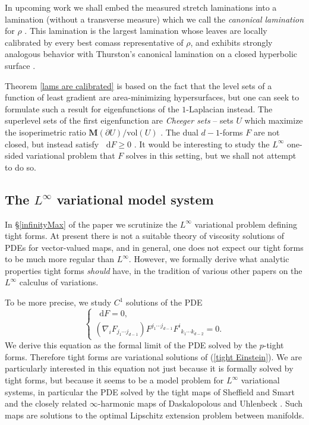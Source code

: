\documentclass[reqno,11pt]{amsart}
\newcommand*\dif{\mathop{}\!\mathrm{d}}
\newcommand{\vol}{\mathrm{vol}}
\newcommand{\Mass}{\mathbf M}
\newcommand{\dfn}[1]{\emph{#1}\index{#1}}
\theoremstyle{definition}
\numberwithin{equation}{section}
\begin{document}
In upcoming work we shall embed the measured stretch laminations into a lamination (without a transverse measure) which we call the \dfn{canonical lamination} for $\rho$ \cite{BackusBest2}.
This lamination is the largest lamination whose leaves are locally calibrated by every best comass representative of $\rho$, and exhibits strongly analogous behavior with Thurston's canonical lamination on a closed hyperbolic surface \cite{Thurston98}.

Theorem \ref{lams are calibrated} is based on the fact that the level sets of a function of least gradient are area-minimizing hypersurfaces, but one can seek to formulate such a result for eigenfunctions of the $1$-Laplacian instead.
The superlevel sets of the first eigenfunction are \dfn{Cheeger sets} -- sets $U$ which maximize the isoperimetric ratio $\Mass(\partial U)/\vol(U)$ \cite{Kawohl2003}.
The dual $d - 1$-forms $F$ are not closed, but instead satisfy $\dif F \geq 0$ \cite{Grieser05}.
It would be interesting to study the $L^\infty$ one-sided variational problem that $F$ solves in this setting, but we shall not attempt to do so.

\subsection{The \texorpdfstring{$L^\infty$ variational}{L-infinity variational} model system}
In \S\ref{infinityMax} of the paper we scrutinize the $L^\infty$ variational problem defining tight forms.
At present there is not a suitable theory of viscosity solutions of PDEs for vector-valued maps, and in general, one does not expect our tight forms to be much more regular than $L^\infty$.
However, we formally derive what analytic properties tight forms \emph{should} have, in the tradition of various other papers \cite{Barron2001,Aronsson67,Sheffield12} on the $L^\infty$ calculus of variations.

To be more precise, we study $C^1$ solutions of the PDE 
\begin{equation}\label{tight Einstein}
\begin{cases}\dif F = 0, \\
	(\nabla_i F_{j_1 \cdots j_{d - 1}}) F^{j_1 \cdots j_{d - 1}} {F^i}_{k_1 \cdots k_{d - 2}} = 0.
\end{cases}
\end{equation}
We derive this equation as the formal limit of the PDE solved by the $p$-tight forms.
Therefore tight forms are variational solutions of (\ref{tight Einstein}).
We are particularly interested in this equation not just because it is formally solved by tight forms, but because it seems to be a model problem for $L^\infty$ variational systems, in particular the PDE solved by the tight maps of Sheffield and Smart \cite{Sheffield12} and the closely related $\infty$-harmonic maps of Daskalopolous and Uhlenbeck \cite{daskalopoulos2022,daskalopoulos2023}.
Such maps are solutions to the optimal Lipschitz extension problem between manifolds.
\end{document}
